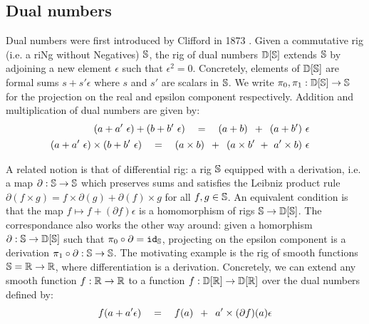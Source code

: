 
\subsection{Dual numbers}\label{1-dual-numbers}

Dual numbers were first introduced by Clifford in 1873 \cite{Clifford73}.
Given a commutative rig (i.e. a riNg without Negatives) $\S$, the rig of dual
numbers $\D[\S]$ extends $\S$ by adjoining a new element $\epsilon$ such that $\epsilon^2 = 0$.
Concretely, elements of $\D[\S]$ are formal sums $s + s' \epsilon$ where
$s$ and $s'$ are scalars in $\S$.
We write $\pi_0, \pi_1 : \D[\S] \to \S$
for the projection on the real and epsilon component respectively.
Addition and multiplication of dual numbers are given by:
\begin{align} \begin{split}\label{linearity}
(a + a' \ \epsilon ) + (b + b' \ \epsilon)
\quad &= \quad (a + b) \s + \s (a + b') \ \epsilon
\end{split}\\
\begin{split}\label{product-rule}
(a + a' \ \epsilon ) \times (b + b' \ \epsilon)
\quad &= \quad (a \times b) \s + \s (a \times b' \ + \ a' \times b) \ \epsilon
\end{split}
\end{align}

A related notion is that of differential rig: a rig $\S$ equipped with a
derivation, i.e. a map $\partial : \S \to \S$ which preserves sums and satisfies
the Leibniz product rule
$\partial(f \times g) = f \times \partial(g) + \partial(f) \times g$ for all
$f, g \in \S$.
An equivalent condition is that the map $f \mapsto f + (\partial f) \epsilon$
is a homomorphism of rigs $\S \to \D[\S]$. The correspondance also works the
other way around: given a homorphism $\partial : \S \to \D[\S]$ such that
$\pi_0 \circ \partial = \id_\S$, projecting on the epsilon component is a
derivation $\pi_1 \circ \partial : \S \to \S$. The motivating example is the rig
of smooth functions $\S = \R \to \R$, where differentiation is a derivation.
Concretely, we can extend any smooth function $f : \R \to \R$ to a
function $f : \D[\R] \to \D[\R]$ over the dual numbers defined by:
\begin{equation}\label{dual-numbers-eq}
f(a + a' \epsilon) \quad = \quad f(a) \s + \s a' \times (\partial f)(a) \epsilon
\end{equation}

